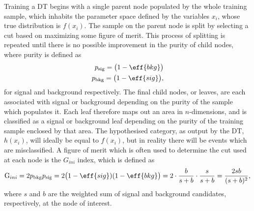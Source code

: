 Training a DT begins with a single parent node populated by the whole
training sample, which inhabits the parameter space defined by the
variables $x_i$, whose true distribution is $f(x_i)$.
The sample on the parent node is split by selecting a cut based on maximizing some figure of merit.
This process of splitting is repeated until there is no possible improvement in the purity of child
nodes, where purity is defined as
\begin{align}
  p_\mathrm{sig} = \big(1-\eff{bkg}\big)\nonumber\\
  p_\mathrm{bkg} = \big(1-\eff{sig}\big),
\end{align}
for signal and background respectively.
The final child nodes, or leaves, are each associated with signal or background depending on the
purity of the sample which populates it.
Each leaf therefore maps out an area in $n$-dimensions, and is classified as a signal or background leaf
depending on the purity of the training sample enclosed by that area.
The hypothesised category, as output by the DT, $h(x_i)$, will ideally be equal to $f(x_i)$, but in reality there will be
events which are misclassified.
A figure of merit which is often used to determine the cut used at each node is the $G_{ini}$
index, which is defined as
\begin{equation}
  \mathrm{G}_{ini} = 2p_\mathrm{bkg}p_\mathrm{sig}
  = 2\big(1-\eff{sig})(1-\eff{bkg}\big)
  = 2\cdot\frac{b}{s+b}\cdot\frac{s}{s+b}
  = \frac{2sb}{(s+b)^2},
\end{equation}
where $s$ and $b$ are the weighted sum of signal and background candidates, respectively, at the
node of interest.


